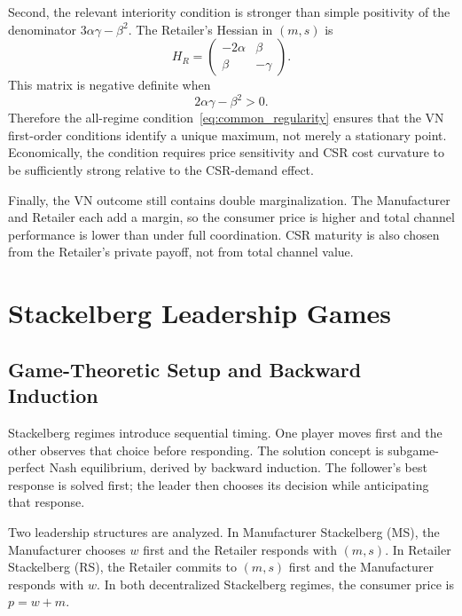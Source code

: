Second, the relevant interiority condition is stronger than simple positivity of the denominator $3\alpha\gamma-\beta^2$. The Retailer's Hessian in $(m,s)$ is
\begin{equation*}
    H_R=\begin{pmatrix}
        -2\alpha & \beta\\
        \beta & -\gamma
    \end{pmatrix}.
\end{equation*}
This matrix is negative definite when
\begin{equation*}
    2\alpha\gamma-\beta^2>0.
\end{equation*}
Therefore the all-regime condition~\eqref{eq:common_regularity} ensures that the VN first-order conditions identify a unique maximum, not merely a stationary point. Economically, the condition requires price sensitivity and CSR cost curvature to be sufficiently strong relative to the CSR-demand effect.

Finally, the VN outcome still contains double marginalization. The Manufacturer and Retailer each add a margin, so the consumer price is higher and total channel performance is lower than under full coordination. CSR maturity is also chosen from the Retailer's private payoff, not from total channel value.

\section{Stackelberg Leadership Games}
\label{sec:stackelberg}

\subsection{Game-Theoretic Setup and Backward Induction}

Stackelberg regimes introduce sequential timing. One player moves first and the other observes that choice before responding. The solution concept is subgame-perfect Nash equilibrium, derived by backward induction. The follower's best response is solved first; the leader then chooses its decision while anticipating that response.

Two leadership structures are analyzed. In Manufacturer Stackelberg (MS), the Manufacturer chooses $w$ first and the Retailer responds with $(m,s)$. In Retailer Stackelberg (RS), the Retailer commits to $(m,s)$ first and the Manufacturer responds with $w$. In both decentralized Stackelberg regimes, the consumer price is $p=w+m$.

